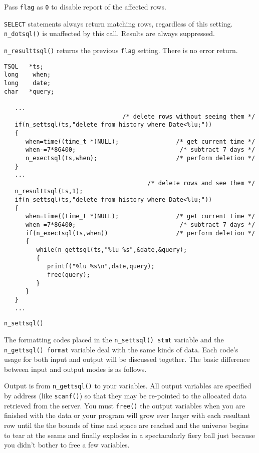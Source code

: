 Pass \verb`flag` as \verb`0` to disable report of the affected rows.

\verb`SELECT` statements always return matching rows, regardless of this
setting. \verb`n_dotsql()` is unaffected by this call. Results are
always suppressed.

\verb`n_resulttsql()` returns the previous \verb`flag` setting. There is
no error return.

\EXAMPLE
\begin{verbatim}
TSQL   *ts;
long    when;
long    date;
char   *query;

   ...
                                 /* delete rows without seeing them */
   if(n_settsql(ts,"delete from history where Date<%lu;"))
   {
      when=time((time_t *)NULL);                /* get current time */
      when-=7*86400;                             /* subtract 7 days */
      n_exectsql(ts,when);                      /* perform deletion */
   }
   ...
                                        /* delete rows and see them */
   n_resulttsql(ts,1);
   if(n_settsql(ts,"delete from history where Date<%lu;"))
   {
      when=time((time_t *)NULL);                /* get current time */
      when-=7*86400;                             /* subtract 7 days */
      if(n_exectsql(ts,when))                   /* perform deletion */
      {
         while(n_gettsql(ts,"%lu %s",&date,&query);
         {
            printf("%lu %s\n",date,query);
            free(query);
         }
      }
   }
   ...
\end{verbatim}

\SEE
\begin{verbatim}
n_settsql()
\end{verbatim}



\DESCRIPTION

The formatting codes placed in the \verb`n_settsql() stmt` variable
and the \verb`n_gettsql() format` variable deal with the same kinds
of data. Each code's usage for both input and output will be discussed
together. The basic difference between input and output modes is as
follows.

Output is from \verb`n_gettsql()` to your variables.  All output
variables are specified by address (like \verb`scanf()`) so that they
may be re-pointed to the allocated data retrieved from the server.  You
must \verb`free()` the output variables when you are finished with the
data or your program will grow ever larger with each resultant row until
the the bounds of time and space are reached and the universe begins to
tear at the seams and finally explodes in a spectacularly fiery ball
just because you didn't bother to free a few variables.

